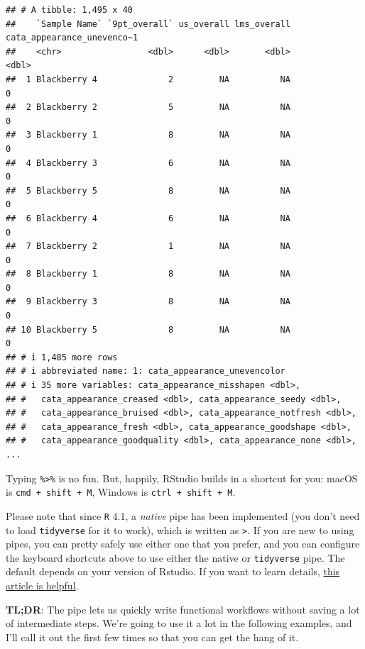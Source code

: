 \documentclass[
]{book}
\begin{document}
\begin{verbatim}
## # A tibble: 1,495 x 40
##    `Sample Name` `9pt_overall` us_overall lms_overall cata_appearance_unevenco~1
##    <chr>                 <dbl>      <dbl>       <dbl>                      <dbl>
##  1 Blackberry 4              2         NA          NA                          0
##  2 Blackberry 2              5         NA          NA                          0
##  3 Blackberry 1              8         NA          NA                          0
##  4 Blackberry 3              6         NA          NA                          0
##  5 Blackberry 5              8         NA          NA                          0
##  6 Blackberry 4              6         NA          NA                          0
##  7 Blackberry 2              1         NA          NA                          0
##  8 Blackberry 1              8         NA          NA                          0
##  9 Blackberry 3              8         NA          NA                          0
## 10 Blackberry 5              8         NA          NA                          0
## # i 1,485 more rows
## # i abbreviated name: 1: cata_appearance_unevencolor
## # i 35 more variables: cata_appearance_misshapen <dbl>,
## #   cata_appearance_creased <dbl>, cata_appearance_seedy <dbl>,
## #   cata_appearance_bruised <dbl>, cata_appearance_notfresh <dbl>,
## #   cata_appearance_fresh <dbl>, cata_appearance_goodshape <dbl>,
## #   cata_appearance_goodquality <dbl>, cata_appearance_none <dbl>, ...
\end{verbatim}

Typing \texttt{\%\textgreater{}\%} is no fun. But, happily, RStudio builds in a shortcut for you: macOS is \texttt{cmd\ +\ shift\ +\ M}, Windows is \texttt{ctrl\ +\ shift\ +\ M}.

Please note that since \texttt{R} 4.1, a \emph{native} pipe has been implemented (you don't need to load \texttt{tidyverse} for it to work), which is written as \texttt{\textbar{}\textgreater{}}. If you are new to using pipes, you can pretty safely use either one that you prefer, and you can configure the keyboard shortcuts above to use either the native or \texttt{tidyverse} pipe. The default depends on your version of Rstudio. If you want to learn details, \href{https://www.tidyverse.org/blog/2023/04/base-vs-magrittr-pipe/}{this article is helpful}.

\textbf{TL;DR}: The pipe lets us quickly write functional workflows without saving a lot of intermediate steps. We're going to use it a lot in the following examples, and I'll call it out the first few times so that you can get the hang of it.
\end{document}
